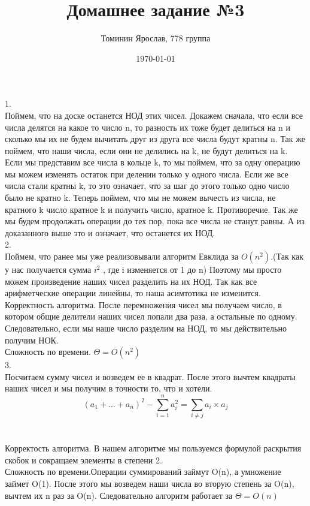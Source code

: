 \documentclass[a4paper,12pt]{article}
\author{Томинин Ярослав, 778 группа}
\title{Домашнее задание №3}
\date{\today}
\begin{document}
 

\maketitle
\newpage


1.\\ 
Поймем, что на доске останется НОД этих чисел. Докажем сначала, что если все числа делятся на какое то число n, то разность их тоже будет делиться на n и сколько мы их не будем вычитать друг из друга все числа будут кратны n. Так же поймем, что наши числа, если они не делились на k, не будут делиться на k. Если мы представим все числа в кольце k, то мы поймем, что за одну операцию мы можем изменять остаток при делении только у одного числа. Если же все числа стали кратны k, то это означает, что за шаг до этого только одно число было не кратно k. Теперь поймем, что мы не можем вычесть из числа, не кратного k число кратное k и получить число, кратное k. Противоречие. Так же мы будем продолжать операции до тех пор, пока все числа не станут равны. А из доказанного выше это и означает, что останется их НОД.\\
2.\\
Поймем, что ранее мы уже реализовывали алгоритм Евклида за $O(n^2)$.(Так как у нас получается сумма $i^2$ , где i изменяется от 1 до n) Поэтому мы просто можем произведение наших чисел разделить на их НОД. Так как все арифметческие операции линейны, то наша асимтотика не изменится.\\
Корректность алгоритма. После перемножения чисел мы получаем число, в котором общие делители наших чисел попали два раза, а остальные по одному. Следовательно, если мы наше число разделим на НОД, то мы действительно получим НОК.\\
Сложность по времени. $\Theta = O(n^2)$\\
3.\\
Посчитаем сумму чисел и возведем ее в квадрат. После этого вычтем квадраты наших чисел и мы получим в точности то, что и хотели.\[ (a_1 + \dots + a_n)^2- \sum_{i = 1}^{n}{a_i^2} = \sum_{i \neq j}{a_i \times a_j} \]\\ \\
Корректость алгоритма. В нашем алгоритме мы пользуемся формулой раскрытия скобок и сокращаем элементы в степени 2.\\
Сложность по времени.Операции суммирований займут  O(n), а умножение займет O(1). После этого мы возведем наши числа во вторую степень за O(n), вычтем их n раз за  O(n). Следовательно алгоритм работает за $\Theta = O(n)$\\
\end{document}
